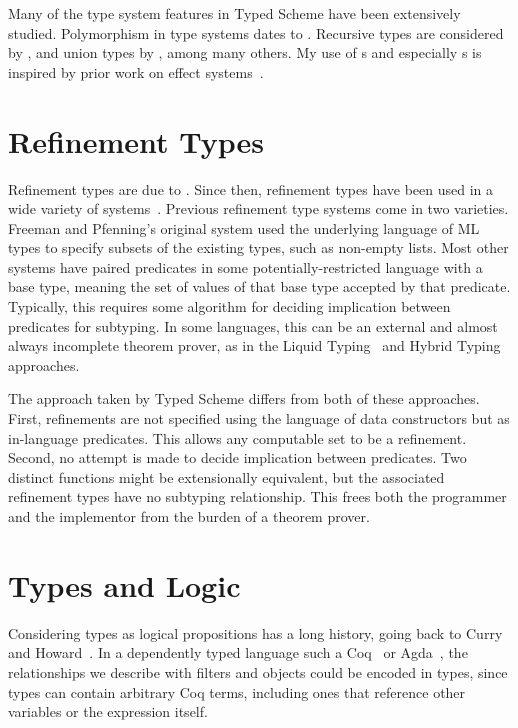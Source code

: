 \begin{schemeregion}
Many of the type system features in Typed
Scheme have been extensively studied.  Polymorphism in type systems
dates to \citet{reynolds}.  Recursive types are considered by
\citet{ac:subtyping-recursive-types}, and union
types by \citet{pierce-union}, among many others. 
My use of \lexeff{}s and especially \lateff{}s is inspired by prior
work on effect systems~\cite{fx87}.  

\section{Refinement Types}

Refinement types are due to \citet{fp:refinement}.
Since then, refinement types have been used in a wide variety of
systems~\cite{liquid-types,wadler-findler,f:hybrid}.  Previous
refinement type systems come in two varieties.  Freeman and Pfenning's
original system used the underlying language of ML types to specify
subsets of the existing types, such as non-empty lists.  Most other
systems have paired predicates in some potentially-restricted language
with a base type, meaning the set of values of that base type accepted
by that predicate.  Typically, this requires some algorithm for
deciding implication between predicates for subtyping.  In some
languages, this can be an external and almost always incomplete theorem
prover, as in the Liquid Typing~\cite{liquid-types} and Hybrid
Typing~\cite{f:hybrid} approaches.  

The approach taken by Typed Scheme differs from both of these
approaches.  First, refinements are not specified using the language
of data constructors but as in-language predicates.  This
allows any computable set to be a refinement.  Second,
no attempt is made to decide implication between predicates.  Two
distinct functions might be extensionally equivalent, but the
associated refinement types have no subtyping relationship.  This
frees both the programmer and the implementor from the burden of
 a theorem prover.  

\section{Types and Logic}

Considering types as logical propositions has a long history,
going back to Curry and Howard~\cite{cf:cl, Howard80}.  In a
dependently typed language such a Coq~\cite{COQBook} or Agda~\cite{agda}, the
relationships we describe with filters and objects could be encoded in
types, since types can contain arbitrary Coq terms, including ones
that reference other variables or the expression itself.  


\end{schemeregion}
